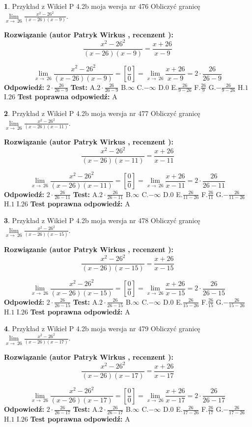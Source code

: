 \documentclass[12pt, a4paper]{article}
\theoremstyle{definition} %
\newtheorem{zad}{}
\newcommand{\zadStart}[1]{\begin{zad}#1\newline}
\newcommand{\zadStop}{\end{zad}}
\newcommand{\rozwStart}[2]{\noindent \textbf{Rozwiązanie (autor #1 , recenzent #2): }\newline}
\newcommand{\rozwStop}{\newline}
\newcommand{\odpStart}{\noindent \textbf{Odpowiedź:}\newline}
\newcommand{\odpStop}{\newline}
\newcommand{\testStart}{\noindent \textbf{Test:}\newline}
\newcommand{\testStop}{\newline}
\newcommand{\kluczStart}{\noindent \textbf{Test poprawna odpowiedź:}\newline}
\newcommand{\kluczStop}{\newline}
\begin{document}
\zadStart{Przykład z Wikieł P 4.2b moja wersja nr 476}
Obliczyć granicę $\lim\limits_{x\to\ 26}\frac{x^{2}-26^{2}}{(x-26)(x-9)}$.
\zadStop
\rozwStart{Patryk Wirkus}{}
$$\frac{x^{2}-26^{2}}{(x-26)(x-9)}=\frac{x+26}{x-9}$$

$$\lim\limits_{x\to\ 26}\frac{x^{2}-26^{2}}{(x-26)(x-9)}=[\frac{0}{0}]=\lim\limits_{x\to\ 26}\frac{x+26}{x-9}=2 \cdot \frac{26}{26-9}$$
\rozwStop
\odpStart
$2 \cdot \frac{26}{26-9}$
\odpStop
\testStart
A.$2 \cdot \frac{26}{26-9}$
B.$\infty$
C.$-\infty$
D.$0$
E.$\frac{26}{9-26}$
F.$\frac{26}{9}$
G.$-\frac{26}{9-26}$
H.$1$
I.$26$
\testStop
\kluczStart
A
\kluczStop



\zadStart{Przykład z Wikieł P 4.2b moja wersja nr 477}
Obliczyć granicę $\lim\limits_{x\to\ 26}\frac{x^{2}-26^{2}}{(x-26)(x-11)}$.
\zadStop
\rozwStart{Patryk Wirkus}{}
$$\frac{x^{2}-26^{2}}{(x-26)(x-11)}=\frac{x+26}{x-11}$$

$$\lim\limits_{x\to\ 26}\frac{x^{2}-26^{2}}{(x-26)(x-11)}=[\frac{0}{0}]=\lim\limits_{x\to\ 26}\frac{x+26}{x-11}=2 \cdot \frac{26}{26-11}$$
\rozwStop
\odpStart
$2 \cdot \frac{26}{26-11}$
\odpStop
\testStart
A.$2 \cdot \frac{26}{26-11}$
B.$\infty$
C.$-\infty$
D.$0$
E.$\frac{26}{11-26}$
F.$\frac{26}{11}$
G.$-\frac{26}{11-26}$
H.$1$
I.$26$
\testStop
\kluczStart
A
\kluczStop



\zadStart{Przykład z Wikieł P 4.2b moja wersja nr 478}
Obliczyć granicę $\lim\limits_{x\to\ 26}\frac{x^{2}-26^{2}}{(x-26)(x-15)}$.
\zadStop
\rozwStart{Patryk Wirkus}{}
$$\frac{x^{2}-26^{2}}{(x-26)(x-15)}=\frac{x+26}{x-15}$$

$$\lim\limits_{x\to\ 26}\frac{x^{2}-26^{2}}{(x-26)(x-15)}=[\frac{0}{0}]=\lim\limits_{x\to\ 26}\frac{x+26}{x-15}=2 \cdot \frac{26}{26-15}$$
\rozwStop
\odpStart
$2 \cdot \frac{26}{26-15}$
\odpStop
\testStart
A.$2 \cdot \frac{26}{26-15}$
B.$\infty$
C.$-\infty$
D.$0$
E.$\frac{26}{15-26}$
F.$\frac{26}{15}$
G.$-\frac{26}{15-26}$
H.$1$
I.$26$
\testStop
\kluczStart
A
\kluczStop



\zadStart{Przykład z Wikieł P 4.2b moja wersja nr 479}
Obliczyć granicę $\lim\limits_{x\to\ 26}\frac{x^{2}-26^{2}}{(x-26)(x-17)}$.
\zadStop
\rozwStart{Patryk Wirkus}{}
$$\frac{x^{2}-26^{2}}{(x-26)(x-17)}=\frac{x+26}{x-17}$$

$$\lim\limits_{x\to\ 26}\frac{x^{2}-26^{2}}{(x-26)(x-17)}=[\frac{0}{0}]=\lim\limits_{x\to\ 26}\frac{x+26}{x-17}=2 \cdot \frac{26}{26-17}$$
\rozwStop
\odpStart
$2 \cdot \frac{26}{26-17}$
\odpStop
\testStart
A.$2 \cdot \frac{26}{26-17}$
B.$\infty$
C.$-\infty$
D.$0$
E.$\frac{26}{17-26}$
F.$\frac{26}{17}$
G.$-\frac{26}{17-26}$
H.$1$
I.$26$
\testStop
\kluczStart
A
\kluczStop
\end{document}
